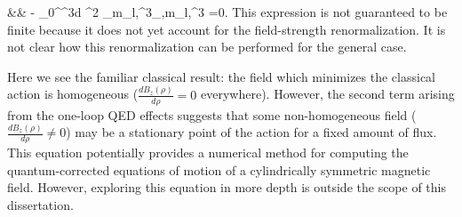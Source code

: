  \ba 
 \label{eqn:stationaryEffAct}
 &&
 	-\frac{\hbar}{2\Delta} \int_{0}^\infty \chi^3d\chi 
 	 \rho^2 
 	 \sum_{m_l,\sigma^3}_{\chi,m_l,\sigma^3} =0.
 \ea 
 This expression is not guaranteed to be finite because it does not yet account for the field-strength 
 renormalization. It is not clear how this renormalization can be performed for the general case.


Here we see the familiar classical result:  the field which minimizes the classical action is homogeneous 
($\frac{d B_z(\rho)}{d \rho} =0$ everywhere).  However, the second term arising from the one-loop 
QED effects suggests that some non-homogeneous field ($\frac{d B_z(\rho)}{d \rho} \ne 0$)
may be a stationary point of the action for a fixed amount of flux. This equation 
potentially provides a numerical method for computing the quantum-corrected equations 
of motion of a cylindrically symmetric magnetic field. However, exploring 
this equation in more depth is outside the scope of this dissertation.
 

